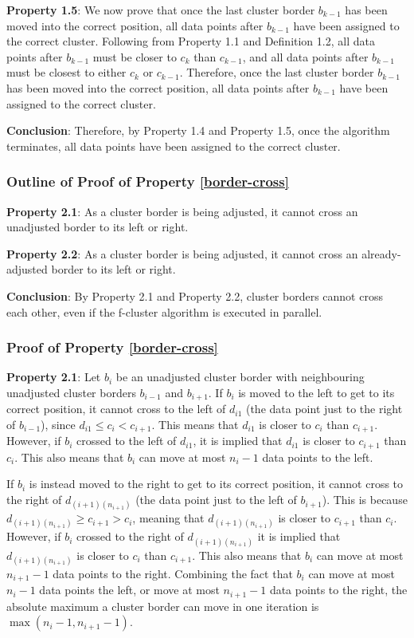\documentclass[conference,compsoc]{IEEEtran}
\begin{document}
\textbf{Property 1.5}: We now prove that once the last cluster border $b_{k-1}$ has been moved into the correct position, all data points after $b_{k-1}$ have been assigned to the correct cluster. Following from Property 1.1 and Definition 1.2, all data points after $b_{k-1}$ must be closer to $c_k$ than $c_{k-1}$, and all data points after $b_{k-1}$ must be closest to either $c_k$ or $c_{k-1}$. Therefore, once the last cluster border $b_{k-1}$ has been moved into the correct position, all data points after $b_{k-1}$ have been assigned to the correct cluster.

\textbf{Conclusion}: Therefore, by Property 1.4 and Property 1.5, once the algorithm terminates, all data points have been assigned to the correct cluster.


\subsubsection{Outline of Proof of Property \ref{border-cross}}

\textbf{Property 2.1}: As a cluster border is being adjusted, it cannot cross an unadjusted border to its left or right.

\textbf{Property 2.2}: As a cluster border is being adjusted, it cannot cross an already-adjusted border to its left or right.

\textbf{Conclusion}: By Property 2.1 and Property 2.2, cluster borders cannot cross each other, even if the f-cluster algorithm is executed in parallel.

\subsubsection{Proof of Property \ref{border-cross}}

\textbf{Property 2.1}: Let $b_i$ be an unadjusted cluster border with neighbouring unadjusted cluster borders $b_{i-1}$ and $b_{i+1}$. If $b_i$ is moved to the left to get to its correct position, it cannot cross to the left of $d_{i1}$ (the data point just to the right of $b_{i-1}$), since $d_{i1} \leq c_i < c_{i+1}$. This means that $d_{i1}$ is closer to $c_i$ than $c_{i+1}$. However, if $b_i$ crossed to the left of $d_{i1}$, it is implied that $d_{i1}$ is closer to $c_{i+1}$ than $c_i$. This also means that $b_i$ can move at most $n_{i}-1$ data points to the left.

If $b_i$ is instead moved to the right to get to its correct position, it cannot cross to the right of $d_{(i+1)(n_{i+1})}$ (the data point just to the left of $b_{i+1}$). This is because $d_{(i+1)(n_{i+1})} \geq c_{i+1} > c_i$, meaning that $d_{(i+1)(n_{i+1})}$ is closer to $c_{i+1}$ than $c_i$. However, if $b_i$ crossed to the right of $d_{(i+1)(n_{i+1})}$ it is implied that $d_{(i+1)(n_{i+1})}$ is closer to $c_i$ than $c_{i+1}$. This also means that $b_i$ can move at most $n_{i+1}-1$ data points to the right. Combining the fact that $b_i$ can move at most $n_{i}-1$ data points the left, or move at most $n_{i+1}-1$ data points to the right, the absolute maximum a cluster border can move in one iteration is $\max(n_{i}-1, n_{i+1}-1)$.
\end{document}
